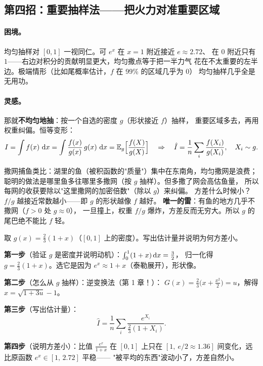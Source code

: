 \subsection{第四招：重要抽样法——把火力对准重要区域}

\paragraph{困境。}
均匀抽样对 $[0,1]$ 一视同仁。可 $e^x$ 在 $x=1$ 附近接近 $e\approx2.72$、
在 $0$ 附近只有 $1$——右边对积分的贡献明显更大，均匀撒点等于把一半力气
花在不太重要的左半边。极端情形（比如尾概率估计，$f$ 在 99\% 的区域几乎为 0）
均匀抽样几乎全是无用功。

\paragraph{灵感。}
那就\textbf{不均匀地抽}：按一个自选的密度 $g$（形状接近 $f$）抽样，
重要区域多去，再用权重纠偏。恒等变形：
\[
I=\int f(x)\,\,\mathrm{d} x=\int\frac{f(x)}{g(x)}\,g(x)\,\,\mathrm{d} x=\mathbb{E}_g\Big[\frac{f(X)}{g(X)}\Big]
\quad\Rightarrow\quad
\hat I=\frac1n\sum_i\frac{f(X_i)}{g(X_i)},\quad X_i\sim g .
\]

\begin{pbox}
撒网捕鱼类比：湖里的鱼（被积函数的"质量"）集中在东南角，均匀撒网是浪费；
聪明的做法是哪里鱼多往哪里多撒网（按 $g$ 抽样）。但多撒了网会高估鱼量，
所以每网的收获要除以"这里撒网的加密倍数"（除以 $g$）来纠偏。
方差什么时候小？$f/g$ 越接近常数越小——即 $g$ 的形状越像 $f$ 越好。
\textbf{唯一的雷}：有鱼的地方几乎不撒网（$f>0$ 处 $g\approx0$），
一旦撞上，权重 $f/g$ 爆炸，方差反而无穷大。所以 $g$ 的尾巴绝不能比 $f$ 轻。
\end{pbox}

\begin{exbox}
取 $g(x)=\frac{2}{3}(1+x)$（$[0,1]$ 上的密度）。写出估计量并说明为何方差小。
\end{exbox}
\begin{sol}
\textbf{第一步}（验证 $g$ 是密度并说明动机）：$\int_0^1(1+x)\,\mathrm{d} x=\frac32$，
归一化得 $g=\frac23(1+x)$。选它是因为 $e^x\approx1+x$（泰勒展开），形状像。

\textbf{第二步}（怎么从 $g$ 抽样）：逆变换法（第 1 章！）：
$G(x)=\frac23\big(x+\frac{x^2}2\big)=u$，解得 $x=\sqrt{1+3u}-1$。

\textbf{第三步}（写出估计量）：
\[
\hat I=\frac1n\sum_i\frac{e^{X_i}}{\frac23(1+X_i)} .
\]

\textbf{第四步}（说明方差小）：比值 $\frac{e^x}{1+x}$ 在 $[0,1]$ 上只在
$[1,\ e/2\approx1.36]$ 间变化，远比原函数 $e^x\in[1,\,2.72]$ 平稳——
"被平均的东西"波动小了，方差自然小。
\end{sol}

